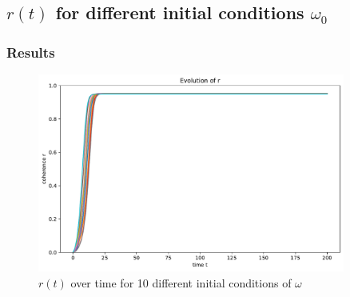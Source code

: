 \documentclass[11pt,a4paper]{article}
\begin{document}
\clearpage
\subsection{$r(t)$ for different initial conditions $\omega_0$}






\subsubsection{Results}

\begin{figure}[h]
	\centering
	\includegraphics[width=0.9\textwidth]{graphics/5_t-vs-r_fixedThetas_omegaDistr=uniform_N=2000_1611572031.pdf}
	\caption{$r(t)$ over time for 10 different initial conditions of $\omega$}
	\label{5}
\end{figure}
\end{document}
